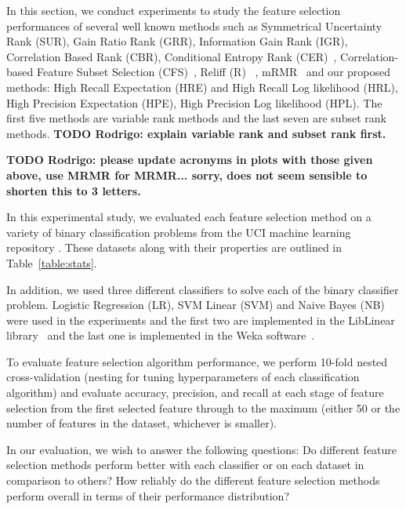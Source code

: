 In this section, we conduct experiments to study the feature selection
performances of several well known methods such as Symmetrical
Uncertainty Rank (SUR), Gain Ratio Rank (GRR), Information Gain Rank
(IGR), Correlation Based Rank (CBR), Conditional Entropy Rank (CER)~\cite{guyon_jmlr03}, 
Correlation-based Feature Subset Selection (CFS)~\cite{Hall1998}, 
Reliff (R)~\cite{Robnik-Sikonja2003} , mRMR~\cite{peng2005} and our proposed 
methods: High Recall Expectation (HRE) and High Recall Log likelihood (HRL), 
High Precision Expectation (HPE), High Precision Log likelihood (HPL). 
The first five methods are variable rank methods and the last seven
are subset rank methods.  {\bf TODO Rodrigo: explain variable rank
and subset rank first.}

{\bf TODO Rodrigo: please update acronyms in plots with those given above,
use MRMR for MRMR... sorry, does not seem sensible to shorten this to 3 letters.}


In this experimental study, we evaluated each feature selection
method on a variety of binary classification problems 
from the UCI machine learning repository \cite{Bache+Lichman:2013}.
These datasets along with their properties are outlined in 
Table~\ref{table:stats}.

In addition, we used three different classifiers to solve each of the
binary classifier problem. Logistic Regression (LR), SVM Linear (SVM) and Naive
Bayes (NB) were used in the experiments and the first two are implemented
in the LibLinear library~\cite{REF08a} and the last one is implemented in
the Weka software~\cite{weka}.
 
To evaluate feature selection algorithm performance, we perform 
10-fold nested cross-validation (nesting for tuning hyperparameters of each classification
algorithm) and evaluate accuracy, precision, and recall at each stage of
feature selection from the first selected feature through to the maximum
(either 50 or the number of features in the dataset, whichever is smaller).

In our evaluation, we wish to answer the following questions:
Do different feature selection methods perform better with
each classifier or on each dataset in comparison to others?
How reliably do the different feature selection methods perform overall
in terms of their performance distribution?

